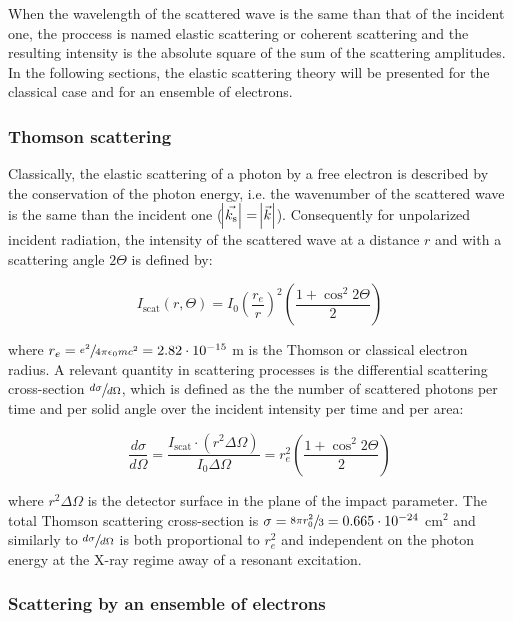 When the wavelength of the scattered wave is the same than that of the incident one, the proccess is named elastic scattering or coherent scattering and the resulting intensity is the absolute square of the sum of the scattering amplitudes. In the following sections, the elastic scattering theory will be presented for the classical case and for an ensemble of electrons.

\subsubsection{Thomson scattering}

Classically, the elastic scattering of a photon by a free electron is described by the conservation of the photon energy, i.e. the wavenumber of the scattered wave is the same than the incident one ($\abs{\vec{k_{\text{s}}}}=\abs{\vec{k}}$). Consequently for unpolarized incident radiation, the intensity of the scattered wave at a distance $r$ and with a scattering angle $2\Theta$ is defined by:

\begin{equation}
        I_{\text{scat}}\left( r,\Theta \right)= I_0 \left( \frac{r_e}{r} \right) ^2 \left( \frac{1+\cos^2{2\Theta}}{2} \right)
\end{equation}

where $r_e= \sfrac{e^2}{4\pi\epsilon_0 m c^2}=2.82\cdot10^{-15}$ m is the Thomson or classical electron radius. A relevant quantity in scattering processes is the differential scattering cross-section $\sfrac{d\sigma}{d\Omega}$, which is defined as the the number of scattered photons per time and per solid angle over the incident intensity per time and per area:

\begin{equation}
        \label{eq:thomson_cross_section}
        \frac{d\sigma}{d\Omega}= \frac{I_{\text{scat}} \cdot \left(r^2 \Delta \Omega \right)}{I_0\Delta \Omega}=r_e^2\left( \frac{1+\cos^2{2\Theta}}{2} \right)
\end{equation}

where $r^2 \Delta \Omega$ is the detector surface in the plane of the impact parameter. The total Thomson scattering cross-section is $\sigma = \sfrac{8\pi r_0^2}{3} = 0.665\cdot10^{-24}$ cm$^2$ and similarly to $\sfrac{d\sigma}{d\Omega}$ is both proportional to $r_e^2$ and independent on the photon energy at the X-ray regime away of a resonant excitation.

\subsubsection{Scattering by an ensemble of electrons}

